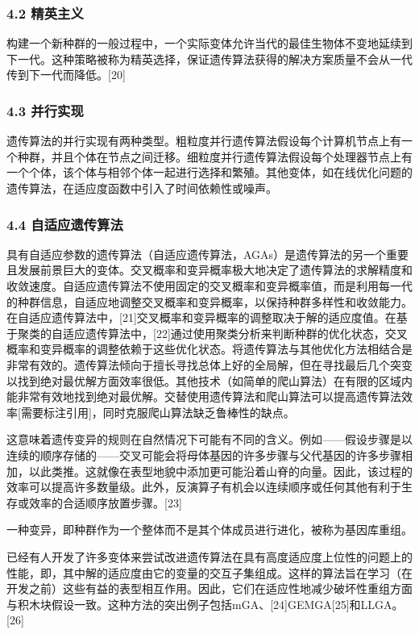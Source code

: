 \subsubsection{4.2 精英主义}
构建一个新种群的一般过程中，一个实际变体允许当代的最佳生物体不变地延续到下一代。这种策略被称为精英选择，保证遗传算法获得的解决方案质量不会从一代传到下一代而降低。[20]

\subsubsection{4.3 并行实现}
遗传算法的并行实现有两种类型。粗粒度并行遗传算法假设每个计算机节点上有一个种群，并且个体在节点之间迁移。细粒度并行遗传算法假设每个处理器节点上有一个个体，该个体与相邻个体一起进行选择和繁殖。其他变体，如在线优化问题的遗传算法，在适应度函数中引入了时间依赖性或噪声。

\subsubsection{4.4 自适应遗传算法}
具有自适应参数的遗传算法（自适应遗传算法，AGAs）是遗传算法的另一个重要且发展前景巨大的变体。交叉概率和变异概率极大地决定了遗传算法的求解精度和收敛速度。自适应遗传算法不使用固定的交叉概率和变异概率值，而是利用每一代的种群信息，自适应地调整交叉概率和变异概率，以保持种群多样性和收敛能力。在自适应遗传算法中，[21]交叉概率和变异概率的调整取决于解的适应度值。在基于聚类的自适应遗传算法中，[22]通过使用聚类分析来判断种群的优化状态，交叉概率和变异概率的调整依赖于这些优化状态。将遗传算法与其他优化方法相结合是非常有效的。遗传算法倾向于擅长寻找总体上好的全局解，但在寻找最后几个突变以找到绝对最优解方面效率很低。其他技术（如简单的爬山算法）在有限的区域内能非常有效地找到绝对最优解。交替使用遗传算法和爬山算法可以提高遗传算法效率[需要标注引用]，同时克服爬山算法缺乏鲁棒性的缺点。

这意味着遗传变异的规则在自然情况下可能有不同的含义。例如——假设步骤是以连续的顺序存储的——交叉可能会将母体基因的许多步骤与父代基因的许多步骤相加，以此类推。这就像在表型地貌中添加更可能沿着山脊的向量。因此，该过程的效率可以提高许多数量级。此外，反演算子有机会以连续顺序或任何其他有利于生存或效率的合适顺序放置步骤。[23]

一种变异，即种群作为一个整体而不是其个体成员进行进化，被称为基因库重组。

已经有人开发了许多变体来尝试改进遗传算法在具有高度适应度上位性的问题上的性能，即，其中解的适应度由它的变量的交互子集组成。这样的算法旨在学习（在开发之前）这些有益的表型相互作用。因此，它们在适应性地减少破坏性重组方面与积木块假设一致。这种方法的突出例子包括mGA、[24]GEMGA[25]和LLGA。[26]


